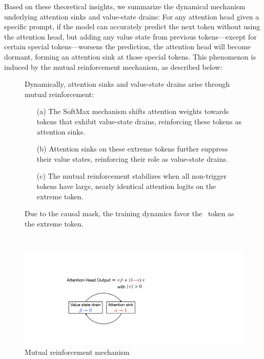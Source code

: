 Based on these theoretical insights, we summarize the dynamical mechanism underlying attention sinks and value-state drains: For any attention head given a specific prompt, if the model can accurately predict the next token without using the attention head, but adding any value state from previous tokens—except for certain special tokens—worsens the prediction, the attention head will become dormant, forming an attention sink at those special tokens. This phenomenon is induced by the mutual reinforcement mechanism, as described below: 
\begin{figure}[h]
    \centering
    \begin{minipage}{0.68\textwidth}
    \begin{claim}\label{claim:mutual-reinforcement}
Dynamically, attention sinks and value-state drains arise through mutual reinforcement:
\begin{itemize}[leftmargin=2em]
\setlength\itemsep{0pt}
    \item[\textup{(a)}] The SoftMax mechanism shifts attention weights towards tokens that exhibit value-state drains, reinforcing these tokens as attention sinks. 
    \item[\textup{(b)}] Attention sinks on these extreme tokens further suppress their value states, reinforcing their role as value-state drains. 
    \item[\textup{(c)}] The mutual reinforcement stabilizes when all non-trigger tokens have large, nearly identical attention logits on the extreme token. 
\end{itemize} 
Due to the causal mask, the training dynamics favor the \bos~token as the extreme token. 
\end{claim}
    \end{minipage}
    ~~~~
    \begin{minipage}{0.28\textwidth}
        \includegraphics[width=\linewidth]{Figures/illustrations/illlustrations_Part2.pdf}
        \caption{Mutual reinforcement mechanism}
        \label{figure:illustrate-mutual-reinforcement}
    \end{minipage}%
\end{figure}

